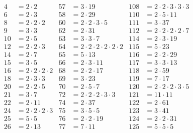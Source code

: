 \vspace*{-2\baselineskip}%
\begin{align*}
   4&=2\cdot2                   &  57&=3\cdot19                        & 108&=2\cdot2\cdot3\cdot3\cdot3             \\
   6&=2\cdot3                   &  58&=2\cdot29                        & 110&=2\cdot5\cdot11                        \\
   8&=2\cdot2\cdot2             &  60&=2\cdot2\cdot3\cdot5             & 111&=3\cdot37                              \\
   9&=3\cdot3                   &  62&=2\cdot31                        & 112&=2\cdot2\cdot2\cdot2\cdot7             \\
  10&=2\cdot5                   &  63&=3\cdot3\cdot7                   & 114&=2\cdot3\cdot19                        \\
  12&=2\cdot2\cdot3             &  64&=2\cdot2\cdot2\cdot2\cdot2\cdot2 & 115&=5\cdot23                              \\
  14&=2\cdot7                   &  65&=5\cdot13                        & 116&=2\cdot2\cdot29                        \\
  15&=3\cdot5                   &  66&=2\cdot3\cdot11                  & 117&=3\cdot3\cdot13                        \\
  16&=2\cdot2\cdot2\cdot2       &  68&=2\cdot2\cdot17                  & 118&=2\cdot59                              \\
  18&=2\cdot3\cdot3             &  69&=3\cdot23                        & 119&=7\cdot17                              \\
  20&=2\cdot2\cdot5             &  70&=2\cdot5\cdot7                   & 120&=2\cdot2\cdot2\cdot3\cdot5             \\
  21&=3\cdot7                   &  72&=2\cdot2\cdot2\cdot3\cdot3       & 121&=11\cdot11                             \\
  22&=2\cdot11                  &  74&=2\cdot37                        & 122&=2\cdot61                              \\
  24&=2\cdot2\cdot2\cdot3       &  75&=3\cdot5\cdot5                   & 123&=3\cdot41                              \\
  25&=5\cdot5                   &  76&=2\cdot2\cdot19                  & 124&=2\cdot2\cdot31                        \\
  26&=2\cdot13                  &  77&=7\cdot11                        & 125&=5\cdot5\cdot5                         \\

\end{align*}
